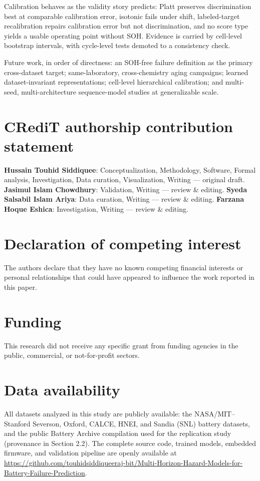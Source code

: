 \documentclass[preprint,12pt]{elsarticle}
\begin{document}
Calibration behaves as the validity story predicts: Platt preserves discrimination best at comparable calibration error, isotonic fails under shift, labeled-target recalibration repairs calibration error but not discrimination, and no score type yields a usable operating point without SOH. Evidence is carried by cell-level bootstrap intervals, with cycle-level tests demoted to a consistency check.

Future work, in order of directness: an SOH-free failure definition as the primary cross-dataset target; same-laboratory, cross-chemistry aging campaigns; learned dataset-invariant representations; cell-level hierarchical calibration; and multi-seed, multi-architecture sequence-model studies at generalizable scale.

\clearpage
\section*{CRediT authorship contribution statement}
\textbf{Hussain Touhid Siddiquee}: Conceptualization, Methodology, Software, Formal analysis, Investigation, Data curation, Visualization, Writing --- original draft. \textbf{Jasimul Islam Chowdhury}: Validation, Writing --- review \& editing. \textbf{Syeda Salsabil Islam Ariya}: Data curation, Writing --- review \& editing. \textbf{Farzana Hoque Eshica}: Investigation, Writing --- review \& editing.

\section*{Declaration of competing interest}
The authors declare that they have no known competing financial interests or personal relationships that could have appeared to influence the work reported in this paper.

\section*{Funding}
This research did not receive any specific grant from funding agencies in the public, commercial, or not-for-profit sectors.

\section*{Data availability}
All datasets analyzed in this study are publicly available: the NASA/MIT--Stanford Severson, Oxford, CALCE, HNEI, and Sandia (SNL) battery datasets, and the public Battery Archive compilation used for the replication study (provenance in Section 2.2). The complete source code, trained models, embedded firmware, and validation pipeline are openly available at \url{https://github.com/touhidsiddiqueeraj-bit/Multi-Horizon-Hazard-Models-for-Battery-Failure-Prediction}.
\end{document}
